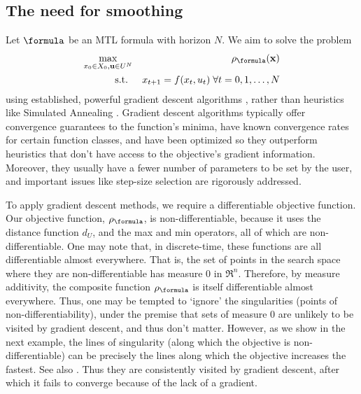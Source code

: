 \subsection{The need for smoothing}
\label{sec:need for smoothing}
Let $\formula$ be an MTL formula with horizon $N$.
We aim to solve the problem
\begin{eqnarray}
\label{eq:min rob problem}
\max_{x_0 \in X_0, \inpSig \in \inpSet^N} && \robf(\sstraj)
\nonumber
\\
\text{s.t. } && x_{t+1} = f(x_t,u_t) \; \forall t=0,1,\ldots,N
\end{eqnarray}
using established, powerful gradient descent algorithms \cite{Polak97_Optim}, rather than heuristics like Simulated Annealing \cite{kirkpatrickV_SA83}.
Gradient descent algorithms typically offer convergence guarantees to the function's minima, have known convergence rates for certain function classes, and have been optimized so they outperform heuristics that don't have access to the objective's gradient information.
Moreover, they usually have a fewer number of parameters to be set by the user, and important issues like step-size selection are rigorously addressed.

To apply gradient descent methods, we require a differentiable objective function. 
Our objective function, $\robf$, is non-differentiable, because it uses the distance function $d_U$, and the max and min operators, all of which are non-differentiable.
One may note that, in discrete-time, these functions are all differentiable almost everywhere. 
That is, the set of points in the search space where they are non-differentiable has measure 0 in $\Re^n$. 
Therefore, by measure additivity, the composite function $\robf$ is itself differentiable almost everywhere.
Thus, one may be tempted to `ignore' the singularities (points of non-differentiability), under the premise that sets of measure 0 are unlikely to be visited by gradient descent, and thus don't matter. 
However, as we show in the next example, the lines of singularity (along which the objective is non-differentiable) can be  precisely the lines along which the objective increases the fastest.
See also \cite{Cortes08_Discontinuous}.
Thus they are consistently visited by gradient descent, after which it fails to converge because of the lack of a gradient.


